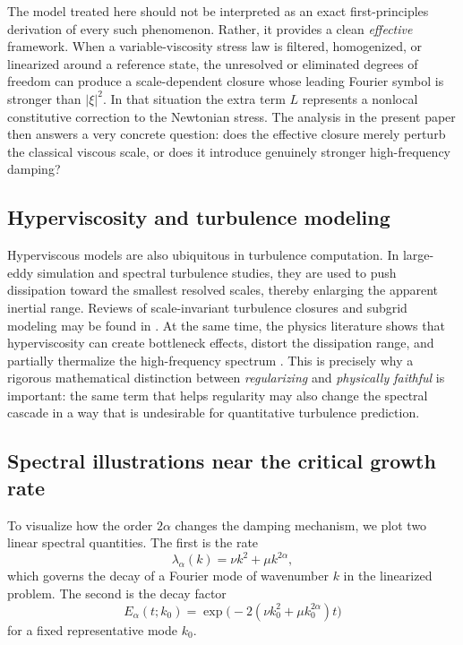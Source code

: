 \documentclass[11pt]{article}
\theoremstyle{definition}
\theoremstyle{remark}
\begin{document}
The model treated here should not be interpreted as an exact first-principles derivation of every such phenomenon. Rather, it provides a clean \emph{effective} framework. When a variable-viscosity stress law is filtered, homogenized, or linearized around a reference state, the unresolved or eliminated degrees of freedom can produce a scale-dependent closure whose leading Fourier symbol is stronger than $|\xi|^2$. In that situation the extra term $L$ represents a nonlocal constitutive correction to the Newtonian stress. The analysis in the present paper then answers a very concrete question: does the effective closure merely perturb the classical viscous scale, or does it introduce genuinely stronger high-frequency damping?

\subsection{Hyperviscosity and turbulence modeling}

Hyperviscous models are also ubiquitous in turbulence computation. In large-eddy simulation and spectral turbulence studies, they are used to push dissipation toward the smallest resolved scales, thereby enlarging the apparent inertial range. Reviews of scale-invariant turbulence closures and subgrid modeling may be found in \cite{MeneveauKatz2000}. At the same time, the physics literature shows that hyperviscosity can create bottleneck effects, distort the dissipation range, and partially thermalize the high-frequency spectrum \cite{HaugenBrandenburg2004,FrischEtAl2008,AgrawalAlexakisBrachetTuckerman2020}. This is precisely why a rigorous mathematical distinction between \emph{regularizing} and \emph{physically faithful} is important: the same term that helps regularity may also change the spectral cascade in a way that is undesirable for quantitative turbulence prediction.

\subsection{Spectral illustrations near the critical growth rate}

To visualize how the order $2\alpha$ changes the damping mechanism, we plot two linear spectral quantities. The first is the rate
\[
\lambda_\alpha(k)=\nu k^2 + \mu k^{2\alpha},
\]
which governs the decay of a Fourier mode of wavenumber $k$ in the linearized problem. The second is the decay factor
\[
E_\alpha(t;k_0)=\exp\bigl(-2(\nu k_0^2+\mu k_0^{2\alpha})t\bigr)
\]
for a fixed representative mode $k_0$.
\end{document}
